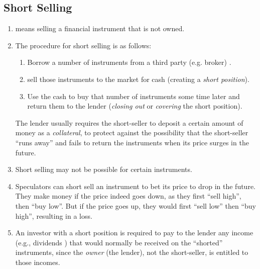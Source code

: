 \subsection{Short Selling}
\begin{enumerate}
\item {} means selling a financial instrument 
that is not owned.
\item The procedure for short selling is as follows:
\begin{enumerate}
\item Borrow a number of instruments  from a third party (e.g.
broker) .

\item sell those instruments  to the market 
for cash  (creating a \emph{short position}).

\item Use the cash  to buy that number of instruments
 some time later  and return them to the lender
 (\emph{closing out} or \emph{covering} the short position).
\end{enumerate}
\begin{note}
The lender  usually requires the short-seller to deposit a
certain amount of money as a \emph{collateral}, to protect against the
possibility that the short-seller ``runs away''  and fails to
return the instruments  when its price surges in the future.
\end{note}

\item Short selling may not be possible for certain instruments.

\item Speculators can short sell an instrument  to
bet  its price to drop {\color{red}} in the
future. They make money if the price indeed goes down, as they first ``sell
high'', then ``buy low''. But if the price goes up, they would first ``sell
low'' then ``buy high'', resulting in a loss.

\item An investor with a short position is required to pay to the lender
 any income (e.g., dividends ) that
would normally be received on the ``shorted'' instruments, since the \emph{owner}
(the lender), not the short-seller, is entitled to those incomes.
\end{enumerate}

